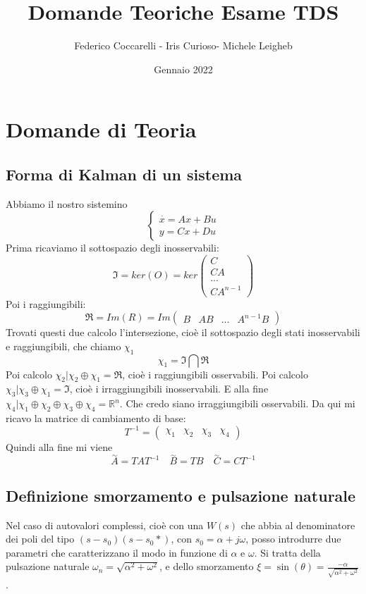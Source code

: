 \documentclass{article}
\title{Domande Teoriche Esame TDS}
\author{Federico Coccarelli - Iris Curioso- Michele Leigheb}
\date{Gennaio 2022}
\begin{document}
\large
\maketitle

\tableofcontents{}


\section{Domande di Teoria}

\subsection{Forma di Kalman di un sistema}
Abbiamo il nostro sistemino
\[ \begin{cases} \overset{\cdot}{x} = Ax+Bu\\y=Cx+Du \end{cases}\]
Prima ricaviamo il sottospazio degli inosservabili:
\[
\mathfrak{I} = ker(O) = ker\begin{pmatrix}C\\CA\\...\\CA^{n-1}\end{pmatrix}  
\]
Poi i raggiungibili:
\[
    \mathfrak{R} = Im(R) = Im\begin{pmatrix}B&AB&...&A^{n-1}B\end{pmatrix}
\]
Trovati questi due calcolo l'intersezione, cioè il sottospazio degli stati inosservabili e raggiungibili,
che chiamo $\chi_1$
\[
  \chi_1 =   \mathfrak{I}\bigcap\mathfrak{R}
\]
Poi calcolo $\chi_2 | \chi_2 \oplus  \chi_1 = \mathfrak{R}$, cioè i raggiungibili osservabili.
Poi calcolo $\chi_3 | \chi_3 \oplus  \chi_1 = \mathfrak{I}$, cioè i irraggiungibili inosservabili.
E alla fine $\chi_4 | \chi_1\oplus \chi_2 \oplus\chi_3 \oplus\chi_4  = \mathbb{R}^n$.
Che credo siano irraggiungibili osservabili.
Da qui mi ricavo la matrice di cambiamento di base:
\[ T^{-1} = \begin{pmatrix}\chi_1&\chi_2&\chi_3&\chi_4 \end{pmatrix}\]
Quindi alla fine mi viene 
\[
    \overset{\sim}{A} = TAT^{-1}\quad \overset{\sim}{B} = TB \quad \overset{\sim}{C} = CT^{-1}
\]


\subsection{Definizione smorzamento e pulsazione naturale}
Nel caso di autovalori complessi, cioè con una $W(s)$ che abbia  al denominatore 
dei poli del tipo $(s-s_0)(s-s_0*)$, con $s_0 = \alpha+j\omega$,
posso introdurre due parametri che caratterizzano il modo in funzione di $\alpha$ e $\omega$.
Si tratta della pulsazione naturale $\omega _n = \sqrt{\alpha^2 + \omega^2}$,
e dello smorzamento $\xi = \sin(\theta) = \frac{-\alpha}{\sqrt{\alpha^2 + \omega^2}} $.
\end{document}
